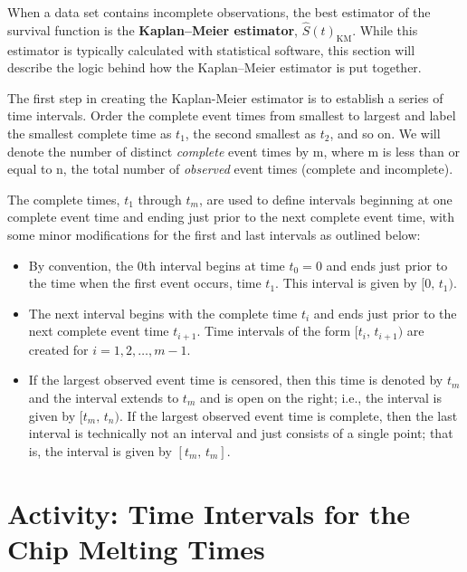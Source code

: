 \documentclass[
]{report}
\providecommand{\tightlist}{%
  \setlength{\itemsep}{0pt}\setlength{\parskip}{0pt}}
\begin{document}
When a data set contains incomplete observations, the best estimator of the survival function is the \textbf{Kaplan--Meier estimator}, \(\hat S(t)_{\text{KM}}\). While this estimator is typically calculated with statistical software, this section will describe the logic behind how the Kaplan--Meier estimator is put together.

The first step in creating the Kaplan-Meier estimator is to establish a series of time intervals. Order the
complete event times from smallest to largest and label the smallest complete time as \(t_1\), the second smallest
as \(t_2\), and so on. We will denote the number of distinct \emph{complete} event times by m, where m is less than or
equal to n, the total number of \emph{observed} event times (complete and incomplete).

The complete times, \(t_1\) through \(t_m\), are used to define intervals beginning at one complete event time and
ending just prior to the next complete event time, with some minor modifications for the first and last intervals
as outlined below:

\begin{itemize}
\tightlist
\item
  By convention, the 0th interval begins at time \(t_0 = 0\) and ends just prior to the time when the first event occurs, time \(t_1\). This interval is given by \([0,\,t_1)\).
\item
  The next interval begins with the complete time \(t_i\) and ends just prior to the next complete event time \(t_{i+1}\). Time intervals of the form \([t_i,\,t_{i+1})\) are created for \(i = 1,2,\dots,m-1\).
\item
  If the largest observed event time is censored, then this time is denoted by \(t_m\) and the interval extends to \(t_m\) and is open on the right; i.e., the interval is given by \([t_m,\,t_n)\). If the largest observed event time is complete, then the last interval is technically not an interval and just consists of a single point; that is, the interval is given by \([t_m,\,t_m]\).
\end{itemize}

\section*{Activity: Time Intervals for the Chip Melting Times}\label{activity-time-intervals-for-the-chip-melting-times}
\end{document}
